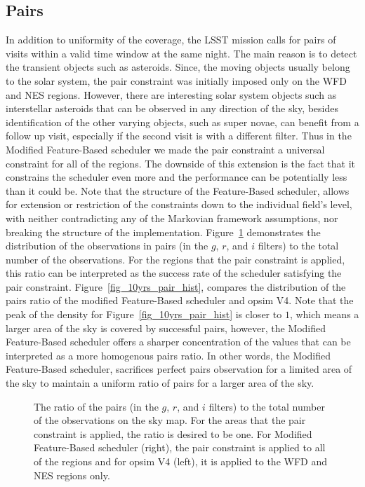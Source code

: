 \documentclass[12pt]{aastex62}
\theoremstyle{definition}
\begin{document}
\subsection{Pairs}
In addition to uniformity of the coverage, the LSST mission calls for pairs of visits within a valid time window at the same night. The main reason is to detect the transient objects such as asteroids. Since, the moving objects usually belong to the solar system, the pair constraint was initially imposed only on the WFD and NES regions. However, there are interesting solar system objects such as interstellar asteroids that can be observed in any direction of the sky, besides identification of the other varying objects, such as super novae, can benefit from a follow up visit, especially if the second visit is with a different filter. Thus in the Modified Feature-Based scheduler we made the pair constraint a universal constraint for all of the regions. The downside of this extension is the fact that it constrains the scheduler even more and the performance can be potentially less than it could be. Note that the structure of the Feature-Based scheduler, allows for extension or restriction of the constraints down to the individual field's level, with neither contradicting any of the Markovian framework assumptions, nor breaking the structure of the implementation. Figure~\ref{fig_10yrs_pair} demonstrates the distribution of the observations in pairs (in the $g$, $r$, and $i$ filters) to the total number of the observations. For the regions that the pair constraint is applied, this ratio can be interpreted as the success rate of the scheduler satisfying the pair constraint. Figure~\ref{fig_10yrs_pair_hist}, compares the distribution of the pairs ratio of the modified Feature-Based scheduler and opsim V4. Note that the peak of the density for Figure~\ref{fig_10yrs_pair_hist} is closer to $1$, which means a larger area of the sky is covered by successful pairs, however, the Modified Feature-Based scheduler offers a sharper concentration of the values that can be interpreted as a more homogenous pairs ratio. In other words, the Modified Feature-Based scheduler, sacrifices perfect pairs observation for a limited area of the sky to maintain a uniform ratio of pairs for a larger area of the sky.

\begin{figure}[h!]
\caption{The ratio of the pairs (in the $g$, $r$, and $i$ filters) to the total number of the observations on the sky map. For the areas that the pair constraint is applied, the ratio is desired to be one. For Modified Feature-Based scheduler (right), the pair constraint is applied to all of the regions and for opsim V4 (left), it is applied to the WFD and NES regions only.}
\label{fig_10yrs_pair}
\end{figure}
\end{document}

